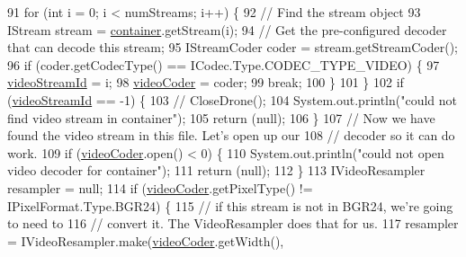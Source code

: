 \begin{DoxyCode}
91         \textcolor{keywordflow}{for} (\textcolor{keywordtype}{int} i = 0; i < numStreams; i++) \{
92             \textcolor{comment}{// Find the stream object}
93             IStream stream = \hyperlink{classworkspace_1_1_a_r_drone_capture_image_1_1src_1_1_display_camera_image_ad5078e38667c841c5c1d4541741fe5a9}{container}.getStream(i);
94             \textcolor{comment}{// Get the pre-configured decoder that can decode this stream;}
95             IStreamCoder coder = stream.getStreamCoder();
96             \textcolor{keywordflow}{if} (coder.getCodecType() == ICodec.Type.CODEC\_TYPE\_VIDEO) \{
97                 \hyperlink{classworkspace_1_1_a_r_drone_capture_image_1_1src_1_1_display_camera_image_aa2f5d378f7aa31734eb27fc38ed672f6}{videoStreamId} = i;
98                 \hyperlink{classworkspace_1_1_a_r_drone_capture_image_1_1src_1_1_display_camera_image_a13aa4bcc23766e6bac7e49ea7c882019}{videoCoder} = coder;
99                 \textcolor{keywordflow}{break};
100             \}
101         \}
102         \textcolor{keywordflow}{if} (\hyperlink{classworkspace_1_1_a_r_drone_capture_image_1_1src_1_1_display_camera_image_aa2f5d378f7aa31734eb27fc38ed672f6}{videoStreamId} == -1) \{
103             \textcolor{comment}{// CloseDrone();}
104             System.out.println(\textcolor{stringliteral}{"could not find video stream in container"});
105             \textcolor{keywordflow}{return} (null);
106         \}
107         \textcolor{comment}{// Now we have found the video stream in this file. Let's open up our}
108         \textcolor{comment}{// decoder so it can do work.}
109         \textcolor{keywordflow}{if} (\hyperlink{classworkspace_1_1_a_r_drone_capture_image_1_1src_1_1_display_camera_image_a13aa4bcc23766e6bac7e49ea7c882019}{videoCoder}.open() < 0) \{
110             System.out.println(\textcolor{stringliteral}{"could not open video decoder for container"});
111             \textcolor{keywordflow}{return} (null);
112         \}
113         IVideoResampler resampler = null;
114         \textcolor{keywordflow}{if} (\hyperlink{classworkspace_1_1_a_r_drone_capture_image_1_1src_1_1_display_camera_image_a13aa4bcc23766e6bac7e49ea7c882019}{videoCoder}.getPixelType() != IPixelFormat.Type.BGR24) \{
115             \textcolor{comment}{// if this stream is not in BGR24, we're going to need to}
116             \textcolor{comment}{// convert it. The VideoResampler does that for us.}
117             resampler = IVideoResampler.make(\hyperlink{classworkspace_1_1_a_r_drone_capture_image_1_1src_1_1_display_camera_image_a13aa4bcc23766e6bac7e49ea7c882019}{videoCoder}.getWidth(),

\end{DoxyCode}
